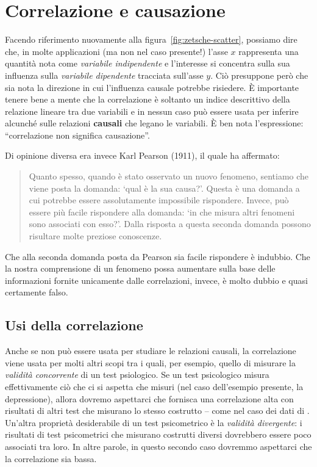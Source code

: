 \documentclass[
  10pt,
  italian,
  a4paper,
  extrafontsizes,onecolumn,openright
  ]{memoir}
\theoremstyle{definition}
\theoremstyle{definition}
\theoremstyle{definition}
\theoremstyle{definition}
\theoremstyle{remark}
\begin{document}
\hypertarget{correlazione-e-causazione}{%
\section{Correlazione e causazione}\label{correlazione-e-causazione}}

Facendo riferimento nuovamente alla figura~\ref{fig:zetsche-scatter}, possiamo dire che, in molte applicazioni (ma non nel caso presente!) l'asse \(x\) rappresenta una quantità nota come \emph{variabile indipendente} e l'interesse si concentra sulla sua influenza sulla \emph{variabile dipendente} tracciata sull'asse \(y\). Ciò presuppone però che sia nota la direzione in cui l'influenza causale potrebbe risiedere. È importante tenere bene a mente che la correlazione è soltanto un indice descrittivo della relazione lineare tra due variabili e in nessun caso può essere usata per inferire alcunché sulle relazioni \textbf{causali} che legano le variabili. È ben nota l'espressione: ``correlazione non significa causazione''.

Di opinione diversa era invece Karl Pearson (1911), il quale ha affermato:

\begin{quote}
Quanto spesso, quando è stato osservato un nuovo fenomeno,
sentiamo che viene posta la domanda: `qual è la sua causa?'. Questa è
una domanda a cui potrebbe essere assolutamente impossibile rispondere.
Invece, può essere più facile rispondere alla domanda: `in che misura
altri fenomeni sono associati con esso?'. Dalla risposta a questa
seconda domanda possono risultare molte preziose conoscenze.
\end{quote}

Che alla seconda domanda posta da Pearson sia facile rispondere è indubbio. Che la nostra comprensione di un fenomeno possa aumentare sulla base delle
informazioni fornite unicamente dalle correlazioni, invece, è molto dubbio e quasi certamente falso.

\hypertarget{usi-della-correlazione}{%
\subsection{Usi della correlazione}\label{usi-della-correlazione}}

Anche se non può essere usata per studiare le relazioni causali, la
correlazione viene usata per molti altri scopi tra i quali, per esempio,
quello di misurare la \emph{validità concorrente} di un test psiologico. Se
un test psicologico misura effettivamente ciò che ci si aspetta che
misuri (nel caso dell'esempio presente, la depressione), allora dovremo
aspettarci che fornisca una correlazione alta con risultati di altri
test che misurano lo stesso costrutto -- come nel caso dei dati di
\autocite{zetschefuture2019}. Un'altra proprietà desiderabile di un test
psicometrico è la \emph{validità divergente}: i risultati di test
psicometrici che misurano costrutti diversi dovrebbero essere poco
associati tra loro. In altre parole, in questo secondo caso dovremmo
aspettarci che la correlazione sia bassa.
\end{document}
